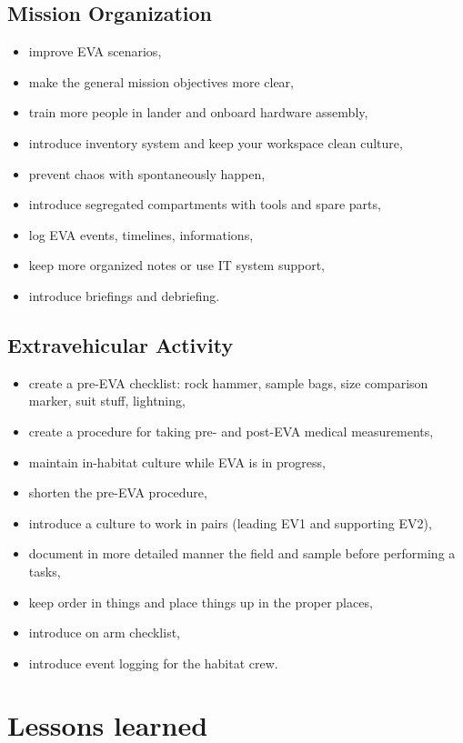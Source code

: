 \documentclass[preprint]{elsarticle}
\begin{document}
\subsection{Mission Organization}
\begin{itemize}
\item improve EVA scenarios,
\item make the general mission objectives more clear,
\item train more people in lander and onboard hardware assembly,
\item introduce inventory system and keep your workspace clean culture,
\item prevent chaos with spontaneously happen,
\item introduce segregated compartments with tools and spare parts,
\item log EVA events, timelines, informations,
\item keep more organized notes or use IT system support,
\item introduce briefings and debriefing.
\end{itemize}

\subsection{Extravehicular Activity}
\begin{itemize}
\item create a pre-EVA checklist: rock hammer, sample bags, size comparison marker, suit stuff, lightning,
\item create a procedure for taking pre- and post-EVA medical measurements,
\item maintain in-habitat culture while EVA is in progress,
\item shorten the pre-EVA procedure,
\item introduce a culture to work in pairs (leading EV1 and supporting EV2),
\item document in more detailed manner the field and sample before performing a tasks,
\item keep order in things and place things up in the proper places,
\item introduce on arm checklist,
\item introduce event logging for the habitat crew.
\end{itemize}

\section{Lessons learned}
\end{document}

